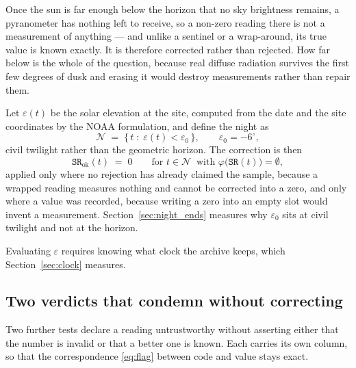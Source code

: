 \documentclass[11pt,a4paper]{article}
\begin{document}
Once the sun is far enough below the horizon that no sky brightness remains, a pyranometer has nothing left to receive, so a non-zero reading there is not a measurement of anything --- and unlike a sentinel or a wrap-around, its true value is known exactly. It is therefore corrected rather than rejected. How far below is the whole of the question, because real diffuse radiation survives the first few degrees of dusk and erasing it would destroy measurements rather than repair them.

Let $\varepsilon(t)$ be the solar elevation at the site, computed from the date and the site coordinates by the NOAA formulation, and define the night as
\begin{equation}
\label{eq:nightmask}
\mathcal{N} \;=\; \bigl\{\, t \;:\; \varepsilon(t) < \varepsilon_{0} \,\bigr\},
\qquad \varepsilon_{0} = -6^{\circ},
\end{equation}
civil twilight rather than the geometric horizon. The correction is then
\begin{equation}
\label{eq:night}
\texttt{SR}_{\mathrm{ok}}(t) \;=\; 0
\qquad \text{for } t \in \mathcal{N}
\ \text{ with } \varphi\bigl(\texttt{SR}(t)\bigr) = \emptyset ,
\end{equation}
applied only where no rejection has already claimed the sample, because a wrapped reading measures nothing and cannot be corrected into a zero, and only where a value was recorded, because writing a zero into an empty slot would invent a measurement. Section~\ref{sec:night_ends} measures why $\varepsilon_0$ sits at civil twilight and not at the horizon.

Evaluating $\varepsilon$ requires knowing what clock the archive keeps, which Section~\ref{sec:clock} measures.

\subsection{Two verdicts that condemn without correcting}

Two further tests declare a reading untrustworthy without asserting either that the number is invalid or that a better one is known. Each carries its own column, so that the correspondence \eqref{eq:flag} between code and value stays exact.
\end{document}
